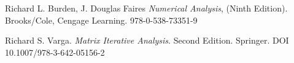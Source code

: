 \documentclass[a4paper]{article}
\begin{document}
\begin{thebibliography}{99}


 Richard L. Burden, J. Douglas Faires \textit{Numerical Analysis}, (Ninth Edition). Brooks/Cole, Cengage Learning. 978-0-538-73351-9

 Richard S. Varga. \textit{Matrix Iterative Analysis}. Second Edition. Springer. DOI 10.1007/978-3-642-05156-2






\end{thebibliography}
\end{document}
